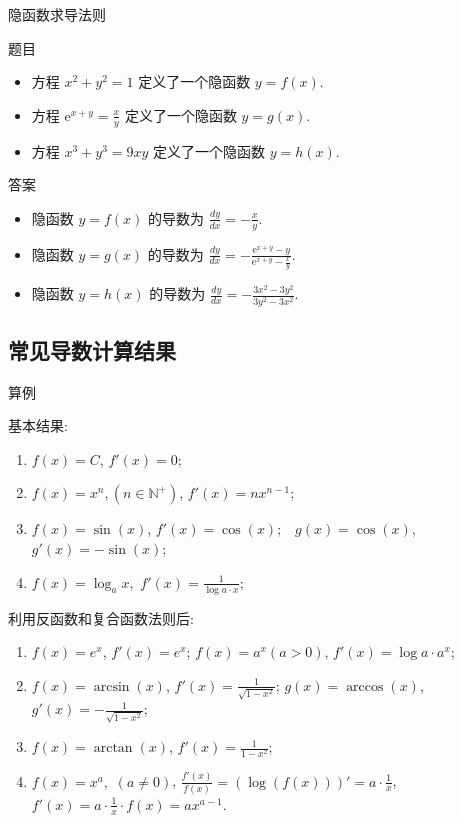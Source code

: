 \documentclass[
10pt,
aspectratio=43,
]{beamer}
\begin{document}
\begin{frame}{隐函数求导法则}
	\begin{block}{题目}
		\begin{itemize}
			\item 方程 $x^2 + y^2 = 1$ 定义了一个隐函数 $y = f(x)$.
			\item 方程 $\displaystyle\mathrm{e}^{x+y}=\frac{x}{y}$ 定义了一个隐函数 $y = g(x)$.
			\item 方程 $x^3 + y^3 = 9xy$ 定义了一个隐函数 $y = h(x)$.
		\end{itemize}
	\end{block}

	\pause

	\begin{exampleblock}{答案}
		\begin{itemize}
			\item 隐函数 $y = f(x)$ 的导数为 $\displaystyle\frac{{dy}}{{dx}} = -\frac{{x}}{{y}}.$
			\item 隐函数 $y = g(x)$ 的导数为 $\displaystyle\frac{{dy}}{{dx}} = -\frac{{\mathrm{e}^{x+y}-y}}{{\mathrm{e}^{x+y}-\frac{x}{y}}}.$
			\item 隐函数 $y = h(x)$ 的导数为 $\displaystyle\frac{{dy}}{{dx}} = -\frac{{3x^2 - 3y^2}}{{3y^2 - 3x^2}}.$
		\end{itemize}
	\end{exampleblock}
\end{frame}

\subsection{常见导数计算结果}
\begin{frame}{算例}
	\begin{block}{}
		{\small 基本结果:
			\begin{enumerate}
				\item $f(x)=C$,  $f'(x) =0$;
				\item $f(x)=x^n, (n\in\mathbb{N}^+)$,  $f'(x) = n x^{n-1}$;
				\item $f(x)=\sin(x)$,  $f'(x)=\cos(x)$; \,\, $g(x)=\cos(x)$,  $g'(x)=-\sin(x)$;
				\item $f(x)=\log_a  x$,\, $f'(x)= \displaystyle\frac{1}{\log a \cdot x}$;
			\end{enumerate}
			利用反函数和复合函数法则后:
			\begin{enumerate}
				\item $f(x) = e^x$, $f'(x) = e^x$; $f(x)=a^x(a>0)$, $f'(x)=\log a \cdot a^x$;
				\item $f(x) = \arcsin(x)$, $f'(x) = \displaystyle\frac{1}{\sqrt{1-x^2}}$; $g(x) = \arccos(x)$, $g'(x) = \displaystyle-\frac{1}{\sqrt{1-x^2}}$;
				\item $f(x) = \arctan(x)$, $f'(x) = \displaystyle\frac{1}{1-x^2}$;
				\item $f(x) = x^a,\,\,(a\neq0)$, $\displaystyle\frac{f'(x)}{f(x)}=\left(\log(f(x))\right)'=a\cdot \frac 1x$, $\displaystyle f'(x)=a\cdot\frac1x\cdot f(x)=ax^{a-1}$.
			\end{enumerate}
		}
	\end{block}
\end{frame}
\end{document}
